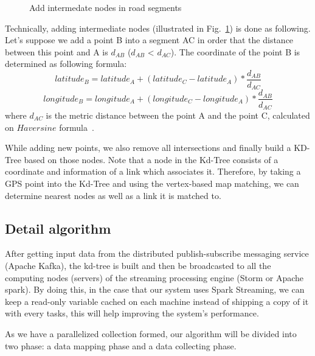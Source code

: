 \documentclass{acm_proc_article-sp}
\begin{document}
	
\begin{figure}[h]
\centering
{}
\caption{Add intermedate nodes in road segments}
\label{fig:addPointsToRoad}
\end{figure}
	
Technically, adding intermediate nodes (illustrated in Fig.~\ref{fig:addPointsToRoad}) is done as following. Let's suppose we add a point B into a segment AC in order that the distance between this point and A is $d_{AB}$ ($d_{AB}$ < $d_{AC}$). The coordinate of the point B is determined as following formula:
\[ latitude_{B} = latitude_{A} + (latitude_{C} - latitude_{A}) \ast \frac{d_{AB}}{d_{AC}}\]
\[ longitude_{B} = longitude_{A} + (longitude_{C} - longitude_{A}) \ast \frac{d_{AB}}{d_{AC}}\]
where $d_{AC}$ is the metric distance between the point A and the point C, calculated on $Haversine$ formula~\cite{haversineweb}.

While adding new points, we also remove all intersections and finally build a KD-Tree based on those nodes. Note that a node in the Kd-Tree consists of a coordinate and information of a link which associates it. Therefore, by taking a GPS point into the Kd-Tree and using the vertex-based map matching, we can determine nearest nodes as well as a link it is matched to.
	
\subsection{Detail algorithm}
		
After getting input data from the distributed publish-subscribe messaging service (Apache Kafka), the kd-tree is built and then be broadcasted to all the computing nodes (servers) of the streaming processing engine (Storm or Apache spark). By doing this, in the case that our system uses Spark Streaming, we can keep a read-only variable cached on each machine instead of shipping a copy of it with every tasks, this will help improving the system's performance.
	
As we have a parallelized collection formed, our algorithm will be divided into two phase: a data mapping phase and a data collecting phase. 
\end{document}
